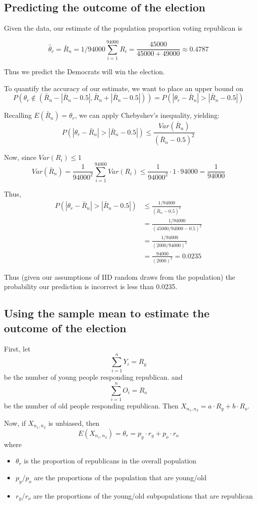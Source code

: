 \documentclass[paper=a4, fontsize=11pt]{scrartcl} %
\numberwithin{equation}{section} %
\numberwithin{figure}{section} %
\numberwithin{table}{section} %
\begin{document}
\subsection{Predicting the outcome of the election}

Given the data, our estimate of the population proportion voting republican is

\[\hat{\theta}_r = \bar{R}_n = 1/94000 \sum_{i = 1}^{94000} R_i = \frac{45000}{45000+49000} \approx 0.4787\]

Thus we predict the Democrats will win the election.

To quantify the accuracy of our estimate, we want to place an upper bound on
\[P\left( \theta_r \notin (\bar{R}_n - | \bar{R}_n - 0.5|,  \bar{R}_n +  | \bar{R}_n - 0.5| )\right) = P(|\theta_r - \bar{R}_n| > |\bar{R}_n - 0.5| )\]

Recalling $E(\bar{R}_n) = \theta_r$, we can apply Chebyshev's inequality, yielding:
\[P(|\theta_r - \bar{R}_n| > |\bar{R}_n - 0.5| ) \leq \frac{Var(\bar{R}_n)}{(\bar{R}_n-0.5)^2}\]

Now, since $Var(R_i) \leq 1$
\[Var(\bar{R}_n) = \frac{1}{94000^2} \sum_{i = 1}^{94000} Var(R_i) \leq \frac{1}{94000^2} \cdot 1\cdot 94000 =  \frac{1}{94000}\]

Thus,
\begin{align*}
P(|\theta_r - \bar{R}_n| > |\bar{R}_n - 0.5| ) &\leq \frac{1/94000}{(\bar{R}_n-0.5)^2} \\
   &=  \frac{1/94000}{(45000/94000-0.5)^2}\\
   &= \frac{1/94000}{(2000/94000)^2} \\
   &=  \frac{94000}{(2000)^2} = 0.0235
\end{align*}

Thus (given our assumptions of IID random draws from the population) the probability our prediction is incorrect is less than 0.0235.

\subsection{Using the sample mean to estimate the outcome of the election}

First, let
\[\sum_{i = 1}^n Y_i = R_y\]
be the number of young people responding republican. and
\[\sum_{i = 1}^n O_i = R_o\]
be the number of old people responding republican.
Then $X_{n_1, n_2} = a\cdot R_y + b \cdot R_o$.

Now, if $X_{n_1, n_2}$ is unbiased, then
\[ E(X_{n_1, n_2}) = \theta_r = p_y \cdot r_y + p_o \cdot r_o\]
where
\begin{itemize}
\item $\theta_r$ is the proportion of republicans in the overall population
\item $p_y$/$p_o$ are the proportions of the population that are young/old
\item $r_y$/$r_o$ are the proportions of the young/old subpopulations that are republican
\end{itemize}
\end{document}
